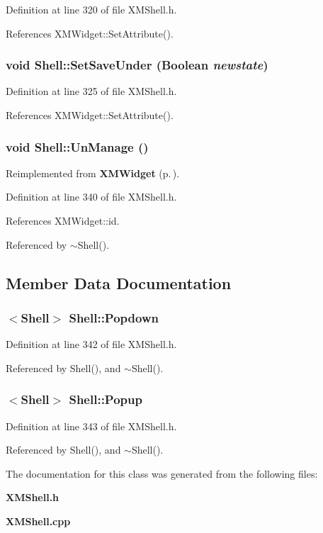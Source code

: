 Definition at line 320 of file XMShell.h.

References XMWidget::Set\-Attribute().
\subsubsection{\setlength{\rightskip}{0pt plus 5cm}void Shell::Set\-Save\-Under (Boolean {\em newstate})\hspace{0.3cm}{\tt  [inline]}}\label{classShell_a6}




Definition at line 325 of file XMShell.h.

References XMWidget::Set\-Attribute().
\subsubsection{\setlength{\rightskip}{0pt plus 5cm}void Shell::Un\-Manage ()\hspace{0.3cm}{\tt  [inline]}}\label{classShell_a10}




Reimplemented from {\bf XMWidget} {\rm (p.\,\pageref{classXMWidget_a17})}.

Definition at line 340 of file XMShell.h.

References XMWidget::id.

Referenced by $\sim$Shell().

\subsection{Member Data Documentation}
\subsubsection{$<$Shell$>$ Shell::Popdown\hspace{0.3cm}{\tt  [protected]}}\label{classShell_n0}




Definition at line 342 of file XMShell.h.

Referenced by Shell(), and $\sim$Shell().
\subsubsection{$<$Shell$>$ Shell::Popup\hspace{0.3cm}{\tt  [protected]}}\label{classShell_n1}




Definition at line 343 of file XMShell.h.

Referenced by Shell(), and $\sim$Shell().

The documentation for this class was generated from the following files:\begin{CompactItemize}
\item 
{\bf XMShell.h}\item 
{\bf XMShell.cpp}\end{CompactItemize}

